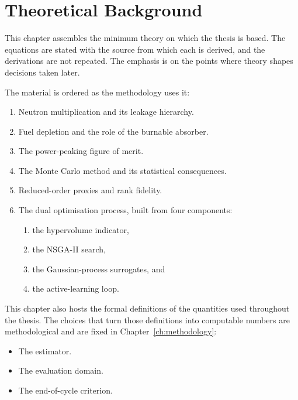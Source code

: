 \providecommand{\openpoint}[1]{\par\noindent\fbox{\parbox{0.97\linewidth}{%
  \textbf{Open point:} #1}}\par}

\chapter{Theoretical Background}
\label{ch:background}

This chapter assembles the minimum theory on which the thesis is based. The
equations are stated with the source from which each is derived, and the
derivations are not repeated. The emphasis is on the points where
theory shapes decisions taken later.

The material is ordered as the methodology uses it:

\begin{enumerate}
  \item Neutron multiplication and its leakage hierarchy.
  \item Fuel depletion and the role of the burnable absorber.
  \item The power-peaking figure of merit.
  \item The Monte Carlo method and its statistical consequences.
  \item Reduced-order proxies and rank fidelity.
  \item The dual optimisation process, built from four components:
  \begin{enumerate}
    \item the hypervolume indicator,
    \item the NSGA-II search,
    \item the Gaussian-process surrogates, and
    \item the active-learning loop.
  \end{enumerate}
\end{enumerate}

This chapter also hosts the formal definitions of the quantities used
throughout the thesis. The choices that turn those definitions into
computable numbers are methodological and are fixed in
Chapter~\ref{ch:methodology}:

\begin{itemize}
  \item The estimator.
  \item The evaluation domain.
  \item The end-of-cycle criterion.
\end{itemize}


